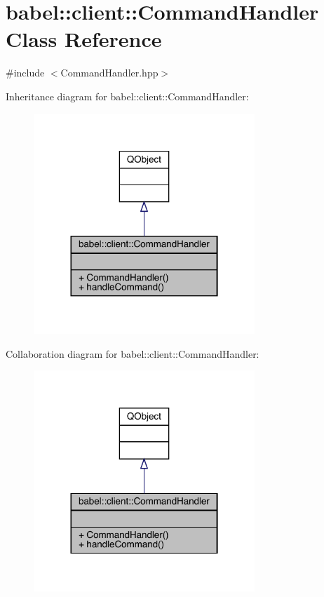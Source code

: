 \hypertarget{classbabel_1_1client_1_1_command_handler}{}\section{babel\+:\+:client\+:\+:Command\+Handler Class Reference}
\label{classbabel_1_1client_1_1_command_handler}


{\ttfamily \#include $<$Command\+Handler.\+hpp$>$}



Inheritance diagram for babel\+:\+:client\+:\+:Command\+Handler\+:\nopagebreak
\begin{figure}[H]
\begin{center}
\leavevmode
\includegraphics[width=236pt]{classbabel_1_1client_1_1_command_handler__inherit__graph}
\end{center}
\end{figure}


Collaboration diagram for babel\+:\+:client\+:\+:Command\+Handler\+:\nopagebreak
\begin{figure}[H]
\begin{center}
\leavevmode
\includegraphics[width=236pt]{classbabel_1_1client_1_1_command_handler__coll__graph}
\end{center}
\end{figure}
